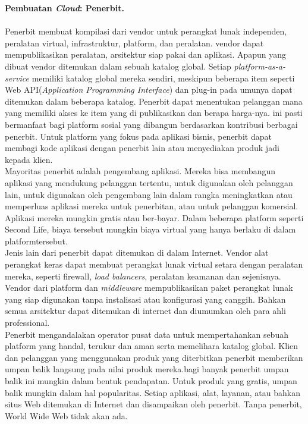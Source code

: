 \textbf{Pembuatan \textit{Cloud}: Penerbit.}\\\\
Penerbit membuat kompilasi dari vendor untuk perangkat lunak independen, peralatan virtual, infrastruktur, platform, dan peralatan. vendor dapat mempublikasikan peralatan, arsitektur siap pakai dan aplikasi. Apapun yang dibuat vendor ditemukan dalam sebuah katalog global. Setiap \textit{platform-as-a-service} memiliki katalog global mereka sendiri, meskipun beberapa  item seperti Web API(\textit{Application Programming Interface}) dan plug-in pada umunya dapat ditemukan dalam beberapa katalog. Penerbit dapat menentukan pelanggan mana yang memiliki akses ke item yang di publikasikan dan berapa harga-nya. ini pasti bermanfaat bagi platform sosial yang dibangun berdasarkan kontribusi berbagai penerbit. Untuk platform yang fokus pada aplikasi bisnis, penerbit dapat membagi kode aplikasi  dengan  penerbit  lain atau menyediakan  produk jadi kepada klien.\\
\tab Mayoritas penerbit adalah pengembang aplikasi. Mereka bisa membangun aplikasi yang mendukung pelanggan tertentu, untuk digunakan oleh pelanggan lain, untuk digunakan oleh pengembang lain dalam rangka meningkatkan atau memperluas aplikasi mereka untuk penerbitan, atau untuk pelanggan komersial. Aplikasi mereka mungkin gratis atau ber-bayar. Dalam beberapa platform seperti Second Life, biaya tersebut mungkin biaya virtual yang hanya berlaku di  dalam platformtersebut.\\
\tab Jenis lain dari penerbit dapat ditemukan di dalam Internet. Vendor alat perangkat keras dapat membuat perangkat lunak virtual setara dengan peralatan mereka, seperti firewall, \textit{load balancers}, peralatan keamanan dan sejenisnya. Vendor dari platform dan \textit{middleware} mempublikasikan paket perangkat lunak yang siap digunakan tanpa instalisasi atau konfigurasi yang canggih. Bahkan semua arsitektur dapat ditemukan di internet dan diumumkan oleh para ahli professional.\\
Penerbit mengandalakan operator pusat data untuk mempertahankan sebuah platform yang handal, terukur dan aman serta memelihara katalog global. Klien dan pelanggan yang menggunakan  produk yang diterbitkan penerbit  memberikan  umpan  balik langsung  pada  nilai produk mereka.bagi banyak penerbit umpan balik ini mungkin dalam bentuk pendapatan. Untuk produk yang gratis, umpan balik mungkin dalam hal popularitas. Setiap aplikasi, alat, layanan, atau bahkan situs Web ditemukan di Internet dan disampaikan oleh penerbit. Tanpa penerbit, World Wide Web tidak akan ada.\\\\
